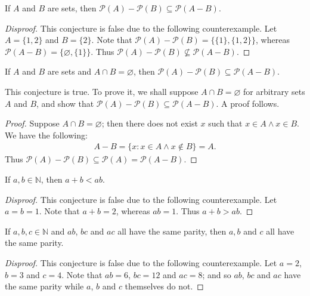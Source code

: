 \documentclass{exam}
\begin{document}
\begin{conjecture}{9.9}
    If $A$ and $B$ are sets, then $\mathscr{P}(A)-\mathscr{P}(B)\subseteq\mathscr{P}(A-B)$.
\end{conjecture}

\begin{proof}[Disproof]
    This conjecture is false due to the following counterexample. Let $A =\{1, 2\}$ and $B=\{2\}$. Note that $\mathscr{P}(A) - \mathscr{P}(B) = \{\{1\}, \{1, 2\}\}$, whereas $\mathscr{P}(A-B)=\{\varnothing, \{1\}\}$. Thus $\mathscr{P}(A)-\mathscr{P}(B)\nsubseteq\mathscr{P}(A-B)$.
\end{proof}

\begin{conjecture}{9.10}
    If $A$ and $B$ are sets and $A\cap B=\varnothing$, then $\mathscr{P}(A)-\mathscr{P}(B)\subseteq\mathscr{P}(A-B)$.
\end{conjecture}

This conjecture is true. To prove it, we shall suppose $A\cap B=\varnothing$ for arbitrary sets $A$ and $B$, and show that $\mathscr{P}(A)-\mathscr{P}(B)\subseteq\mathscr{P}(A-B)$. A proof follows.
\begin{proof}
    Suppose $A\cap B = \varnothing$; then there does not exist $x$ such that $x\in A\land x\in B$. We have the following:
    \begin{align*}
        A-B=\{x:x\in A\land x\notin B\} = A.
    \end{align*}
    Thus $\mathscr{P}(A)-\mathscr{P}(B)\subseteq\mathscr{P}(A)=\mathscr{P}(A-B)$.
\end{proof}

\begin{conjecture}{9.11}
    If $a,b\in\mathbb N$, then $a+b<ab$.
\end{conjecture}

\begin{proof}[Disproof]
    This conjecture is false due to the following counterexample. Let $a = b = 1$. Note that $a + b = 2$, whereas $ab = 1$. Thus $a+b>ab$.
\end{proof}

\begin{conjecture}{9.12}
    If $a, b, c\in\mathbb N$ and $ab$, $bc$ and $ac$ all have the same parity, then $a,b$ and $c$ all have the same parity.
\end{conjecture}

\begin{proof}[Disproof]
    This conjecture is false due to the following counterexample. Let $a = 2$, $b=3$ and $c = 4$. Note that $ab = 6$, $bc = 12$ and $ac = 8$; and so $ab$, $bc$ and $ac$ have the same parity while $a$, $b$ and $c$ themselves do not.
\end{proof}
\end{document}
